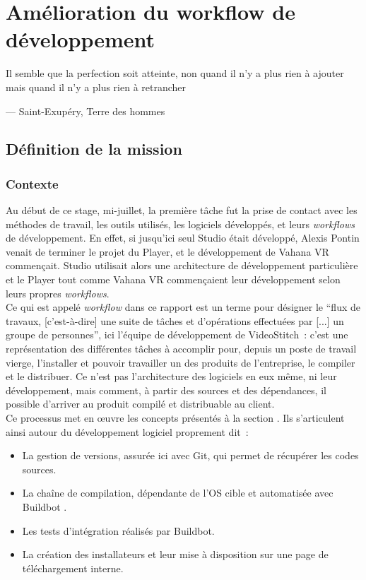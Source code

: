 \chapter{Amélioration du workflow de développement}
\epigraph{Il semble que la perfection soit atteinte, non quand il n'y a plus 
rien à ajouter mais quand il n'y a plus rien à retrancher}{--- \small{\textup{Saint-Exupéry,
Terre des hommes}}}

\section{Définition de la mission}
\subsection{Contexte}
Au début de ce stage, mi-juillet, la première tâche fut la prise de contact avec 
les méthodes de travail, les outils utilisés, les logiciels développés, et leurs
\textit{workflows} de développement. En effet, si jusqu'ici seul Studio était développé, Alexis
Pontin venait de terminer le projet du Player, et le développement de Vahana
VR commençait. Studio utilisait alors une architecture de développement particulière
et le Player tout comme Vahana VR commençaient leur développement selon leurs propres
\textit{workflows}.\\
\newline
Ce qui est appelé \textit{workflow} dans ce rapport est un terme pour désigner le 
\enquote{flux de travaux, [c'est-à-dire] une suite de tâches et
d'opérations effectuées par [...] un groupe de personnes}\cite{workflow}, ici l'équipe de développement
de VideoStitch~: c'est une représentation des différentes tâches à accomplir pour, depuis un poste de travail vierge, 
l'installer et pouvoir travailler un des produits de l'entreprise, le compiler et le distribuer.
Ce n'est pas l'architecture des logiciels en eux même, ni leur développement,
mais comment, à partir des sources et des dépendances, il possible d'arriver au produit
compilé et distribuable au client.\\
Ce processus met en \oe uvre les concepts présentés à la section 
. Ils s'articulent ainsi autour du développement
logiciel proprement dit~:\cite{software-build}\cite{build-automation}
\begin{itemize}
  \item La gestion de versions, assurée ici avec Git\cite{gestion-versions}, qui permet
  de récupérer les codes sources.
  \item La chaîne de compilation, dépendante de l'OS cible et automatisée avec Buildbot 
  \cite{chaine-compilation}\cite{integration-continue}.
  \item Les tests d'intégration\cite{integration-continue} réalisés par Buildbot.
  \item La création des installateurs et leur mise à disposition sur une page de téléchargement interne.
\end{itemize}
